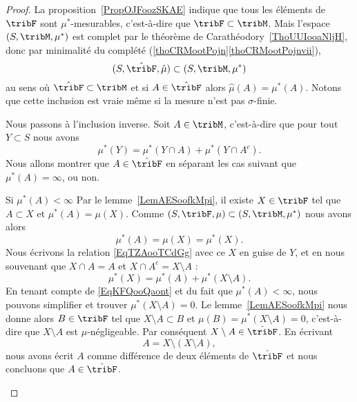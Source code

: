 \begin{proof}
    La proposition~\ref{PropOJFoozSKAE} indique que tous les éléments de \( \tribF\) sont \( \mu^*\)-mesurables, c'est-à-dire que \( \tribF\subset \tribM\). Mais l'espace \( (S,\tribM,\mu^*)\) est complet par le théorème de Carathéodory~\ref{ThoUUIooaNljH}, donc par minimalité du complété (\ref{thoCRMootPojn}\ref{thoCRMootPojnvii}),
    \begin{equation}
        (S,\hat\tribF,\hat\mu)\subset(S,\tribM,\mu^*)
    \end{equation}
    au sens où \( \hat\tribF\subset\tribM\) et si \( A\in\hat\tribF\) alors \( \hat\mu(A)=\mu^*(A)\). Notons que cette inclusion est vraie même si la mesure n'est pas \( \sigma\)-finie.

    Nous passons à l'inclusion inverse. Soit \( A\in\tribM\), c'est-à-dire que pour tout \( Y\subset S\) nous avons
    \begin{equation}    \label{EqTZAooTCdGg}
        \mu^*(Y)=\mu^*(Y\cap A)+\mu^*(Y\cap A^c).
    \end{equation}
    Nous allons montrer que \( A\in\hat\tribF\) en séparant les cas suivant que \( \mu^*(A)=\infty\), ou non.

    \begin{subproof}
    \item[Si \( \mu^*(A)<\infty\)]
        Par le lemme~\ref{LemAESoofkMpi}, il existe \( X\in\tribF\) tel que \( A\subset X\) et \( \mu^*(A)=\mu(X)\). Comme \( (S,\tribF,\mu)\subset (S,\tribM,\mu^*)\) nous avons alors
        \begin{equation}    \label{EqKFQooQaont}
            \mu^*(A)=\mu(X)=\mu^*(X).
        \end{equation}
        Nous écrivons la relation \eqref{EqTZAooTCdGg} avec ce \( X\) en guise de \( Y\), et en nous souvenant que \( X\cap A=A\) et \( X\cap A^c=X\setminus A\) :
        \begin{equation}
            \mu^*(X)=\mu^*(A)+\mu^*(X\setminus A).
        \end{equation}
        En tenant compte de \eqref{EqKFQooQaont} et du fait que \( \mu^*(A)<\infty\), nous pouvons simplifier et trouver \( \mu^*(X\setminus A)=0\). Le lemme~\ref{LemAESoofkMpi} nous donne alors \( B\in\tribF\) tel que \( X\setminus A\subset B\) et \( \mu(B)=\mu^*(X\setminus A)=0\), c'est-à-dire que \( X\setminus A\) est \( \mu\)-négligeable. Par conséquent \( X\setminus A\in\hat\tribF\). En écrivant
        \begin{equation}
            A=X\setminus(X\setminus A),
        \end{equation}
        nous avons écrit \( A\) comme différence de deux éléments de \( \hat\tribF\) et nous concluons que \( A\in\hat\tribF\).


\end{subproof}
\end{proof}
